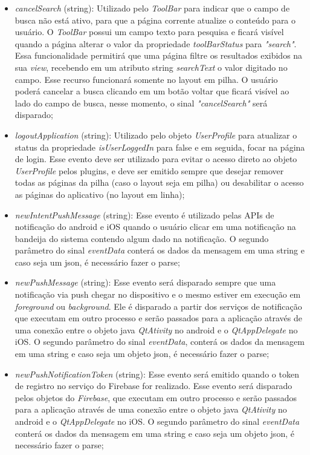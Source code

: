 \begin{itemize}
\begin{itemize}
		\item \textit{cancelSearch} (string): Utilizado pelo \textit{ToolBar} para indicar que o campo de busca não está ativo, para que a página corrente atualize o conteúdo para o usuário. O \textit{ToolBar} possui um campo texto para pesquisa e ficará visível quando a página alterar o valor da propriedade \textit{toolBarStatus} para \textit{"search"}. Essa funcionalidade permitirá que uma página filtre os resultados exibidos na sua \textit{view}, recebendo em um atributo string \textit{searchText} o valor digitado no campo. Esse recurso funcionará somente no layout em pilha. O usuário poderá cancelar a busca clicando em um botão voltar que ficará visível ao lado do campo de busca, nesse momento, o sinal \textit{"cancelSearch"} será disparado;

		\item \textit{logoutApplication} (string): Utilizado pelo objeto \textit{UserProfile} para atualizar o status da propriedade \textit{isUserLoggedIn} para false e em seguida, focar na página de login. Esse evento deve ser utilizado para evitar o acesso direto ao objeto \textit{UserProfile} pelos plugins, e deve ser emitido sempre que desejar remover todas as páginas da pilha (caso o layout seja em pilha) ou desabilitar o acesso as páginas do aplicativo (no layout em linha);

		\item \textit{newIntentPushMessage} (string): Esse evento é utilizado pelas APIs de notificação do android e iOS quando o usuário clicar em uma notificação na bandeija do sistema contendo algum dado na notificação. O segundo parâmetro do sinal \textit{eventData} conterá os dados da mensagem em uma string e caso seja um json, é necessário fazer o parse;

		\item \textit{newPushMessage} (string): Esse evento será disparado sempre que uma notificação via push chegar no dispositivo e o mesmo estiver em execução em \textit{foreground} ou \textit{background}. Ele é disparado a partir dos serviços de notificação que executam em outro processo e serão passados para a aplicação através de uma conexão entre o objeto java \textit{QtAtivity} no android e o \textit{QtAppDelegate} no iOS. O segundo parâmetro do sinal \textit{eventData}, conterá os dados da mensagem em uma string e caso seja um objeto json, é necessário fazer o parse;

		\item \textit{newPushNotificationToken} (string): Esse evento será emitido quando o token de registro no serviço do Firebase for realizado. Esse evento será disparado pelos objetos do \textit{Firebase}, que executam em outro processo e serão passados para a aplicação através de uma conexão entre o objeto java \textit{QtAtivity} no android e o \textit{QtAppDelegate} no iOS. O segundo parâmetro do sinal \textit{eventData} conterá os dados da mensagem em uma string e caso seja um objeto json, é necessário fazer o parse;


\end{itemize}
\end{itemize}
